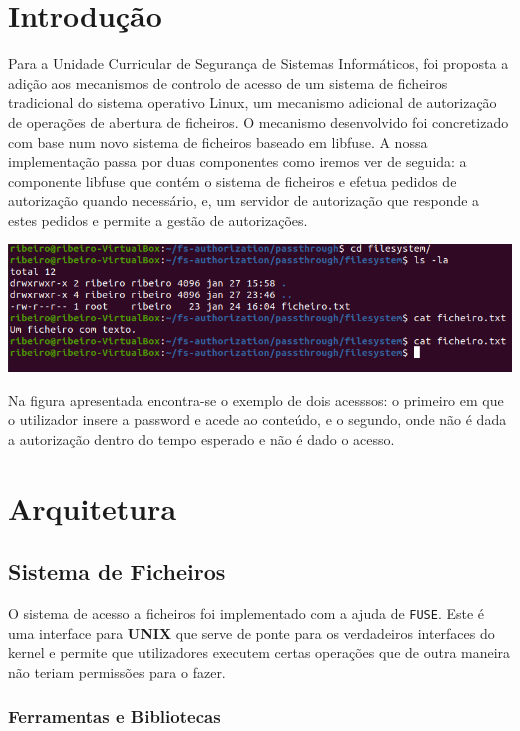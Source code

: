 \section{Introdução}

Para a Unidade Curricular de Segurança de Sistemas Informáticos, foi proposta a adição aos mecanismos de controlo de acesso de um sistema de ficheiros tradicional do sistema operativo Linux, um mecanismo adicional de autorização de operações de abertura de ficheiros. O mecanismo desenvolvido foi concretizado com base num novo sistema de ficheiros baseado em libfuse. A nossa implementação passa por duas componentes como iremos ver de seguida: a componente libfuse que contém o sistema de ficheiros e efetua pedidos de autorização quando necessário, e, um servidor de autorização que responde a estes pedidos e permite a gestão de autorizações. 

\begin{center}
    \includegraphics[width=.75\linewidth]{img/print.png}
\end{center} 

Na figura apresentada encontra-se o exemplo de dois acesssos: o primeiro em que o utilizador insere a password e acede ao conteúdo, e o segundo, onde não é dada a autorização dentro do tempo esperado e não é dado o acesso.

\section{Arquitetura}

\subsection{Sistema de Ficheiros}

O sistema de acesso a ficheiros foi implementado com a ajuda de \texttt{FUSE}. Este é uma interface para \textbf{UNIX} que serve de ponte para os verdadeiros interfaces do kernel e permite que utilizadores executem certas operações que de outra maneira não teriam permissões para o fazer.

\subsubsection{Ferramentas e Bibliotecas}

